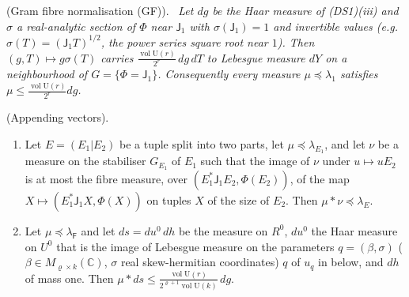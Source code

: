 \documentclass[10pt]{amsart}
\theoremstyle{definition}
\theoremstyle{remark}
\newcommand{\C}{\mathbb C}
\providecommand{\pboF}{\mathsf F}
\providecommand{\pboR}{R^0}
\providecommand{\pboU}{U^0}
\providecommand{\pboV}{\operatorname{vol}\mathrm U}
\newenvironment{quotedthm}[2]{\par\medskip\noindent\begingroup
  \textbf{#1}#2.\ \itshape\ignorespaces}{\endgroup\par\medskip}
\begin{document}
\begin{quotedthm}{\cite[Lemma~8.80]{P51}}{ (Gram fibre normalisation \textup{(GF)})}
Let $dg$ be the Haar measure of \textup{(DS1)(iii)} and $\sigma$ a real-analytic section of $\Phi$ near
$\mathsf J_1$ with $\sigma(\mathsf J_1)=1$ and invertible values (e.g.\ $\sigma(T)=(\mathsf J_1T)^{1/2}$, the
power series square root near $1$). Then $(g,T)\mapsto g\sigma(T)$ carries $\frac{\pboV(r)}{2^r}\,dg\,dT$ to
Lebesgue measure $dY$ on a neighbourhood of $G=\{\Phi=\mathsf J_1\}$. Consequently every measure
$\mu\preceq\lambda_1$ satisfies $\mu\le\frac{\pboV(r)}{2^r}dg$.
\end{quotedthm}

\begin{quotedthm}{\cite[Lemma~8.81]{P51}}{ (Appending vectors)}
\begin{enumerate}
\item[(a)] Let $E=(E_1|E_2)$ be a tuple split into two parts, let $\mu\preceq\lambda_{E_1}$, and let
$\nu$ be a measure on the stabiliser $G_{E_1}$ of $E_1$ such that the image of $\nu$ under $u\mapsto
uE_2$ is at most the fibre measure, over $(E_1^*\mathsf J_1E_2,\Phi(E_2))$, of the map $X\mapsto(E_1^*
\mathsf J_1X,\Phi(X))$ on tuples $X$ of the size of $E_2$. Then $\mu*\nu\preceq\lambda_E$.
\item[(b)] Let $\mu\preceq\lambda_{\pboF}$ and let $ds=du^0\,dh$ be the measure on $\pboR$, $du^0$ the
Haar measure on $\pboU$ that is the image of Lebesgue measure on the parameters $q=(\beta,\sigma)$
($\beta\in M_{\varrho\times k}(\C)$, $\sigma$ real skew-hermitian coordinates)  $q$ of
$u_q$ in {\cite[(81)]{P51}} below, and $dh$ of mass one. Then $\mu*ds\le\frac{\pboV(r)}{2^{\varrho+1}\pboV(k)}\,dg$.
\end{enumerate}
\end{quotedthm}
\end{document}
